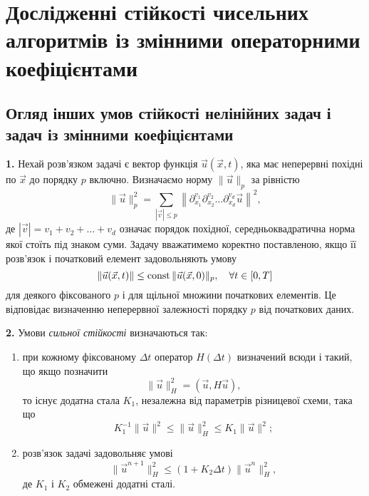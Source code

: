 \chapter{Дослідженні стійкості чисельних алгоритмів із змінними операторними коефіцієнтами}


\section{Огляд інших умов стійкості нелінійних задач і задач із змінними коефіцієнтами}

\textbf{1.} Нехай розв'язком задачі є вектор функція $\vec u(\vec x, t)$, яка має неперервні похідні по $\vec x$ до порядку $p$ включно. Визначаємо норму $\|\vec u\|_p$ за рівністю
\begin{equation*}
    \|\vec u\|_p^2 = \sum_{|\vec v| \le p} \left\| \partial_{x_1}^{v_1} \partial_{x_2}^{v_2} \dots \partial_{x_d}^{v_d} \vec u\right\|^2,
\end{equation*}
де $|\vec v| = v_1 + v_2 + \dots + v_d$ означає порядок похідної, середньоквадратична норма якої стоїть під знаком суми. Задачу вважатимемо коректно поставленою, якщо її розв'язок і початковий елемент задовольняють умову
\begin{equation*}
    \|\vec u(\vec x, t)\| \le \const \|\vec u(\vec x, 0)\|_p, \quad \forall t \in [0, T]
\end{equation*}
для деякого фіксованого $p$ і для щільної множини початкових елементів. Це відповідає визначенню неперервної залежності порядку $p$ від початкових даних. \medskip

\textbf{2.} Умови \textit{сильної стійкості} визначаються так: 
\begin{enumerate}
    \item при кожному фіксованому $\Delta t$ оператор $H(\Delta t)$ визначений всюди і такий, що якщо позначити 
    \begin{equation*}
        \|\vec u\|_H^2 = (\vec u, H \vec u),
    \end{equation*}
    то існує додатна стала $K_1$, незалежна від параметрів різницевої схеми, така що 
    \begin{equation*}
        K_1^{-1} \|\vec u\|^2 \le \|\vec u\|_H^2 \le K_1 \|\vec u\|^2;
    \end{equation*}
    \item розв'язок задачі задовольняє умові
    \begin{equation}
        \label{eq:7.1}
        \|\vec u^{n+1}\|_H^2 \le (1 + K_2 \Delta t) \|\vec u^n\|_H^2,
    \end{equation}
    де $K_1$ і $K_2$ обмежені додатні сталі.
\end{enumerate}

